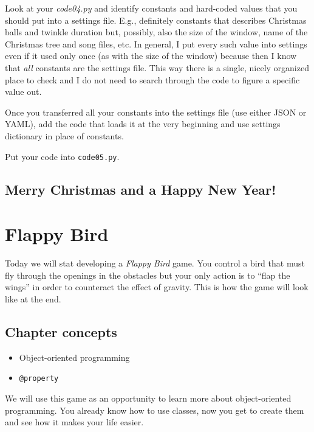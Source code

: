 \documentclass[
]{book}
\providecommand{\tightlist}{%
  \setlength{\itemsep}{0pt}\setlength{\parskip}{0pt}}
\begin{document}
Look at your \emph{code04.py} and identify constants and hard-coded values that you should put into a settings file. E.g., definitely constants that describes Christmas balls and twinkle duration but, possibly, also the size of the window, name of the Christmas tree and song files, etc. In general, I put every such value into settings even if it used only once (as with the size of the window) because then I know that \emph{all} constants are the settings file. This way there is a single, nicely organized place to check and I do not need to search through the code to figure a specific value out.

Once you transferred all your constants into the settings file (use either JSON or YAML), add the code that loads it at the very beginning and use settings dictionary in place of constants.

Put your code into \texttt{code05.py}.

\hypertarget{merry-christmas-and-a-happy-new-year}{%
\section{Merry Christmas and a Happy New Year!}\label{merry-christmas-and-a-happy-new-year}}

\hypertarget{flappy-bird}{%
\chapter{Flappy Bird}\label{flappy-bird}}

Today we will stat developing a \emph{Flappy Bird} game. You control a bird that must fly through the openings in the obstacles but your only action is to ``flap the wings'' in order to counteract the effect of gravity. This is how the game will look like at the end.

\hypertarget{chapter-concepts-7}{%
\section{Chapter concepts}\label{chapter-concepts-7}}

\begin{itemize}
\tightlist
\item
  Object-oriented programming
\item
  \texttt{@property}
\end{itemize}

We will use this game as an opportunity to learn more about object-oriented programming. You already know how to use classes, now you get to create them and see how it makes your life easier.
\end{document}
